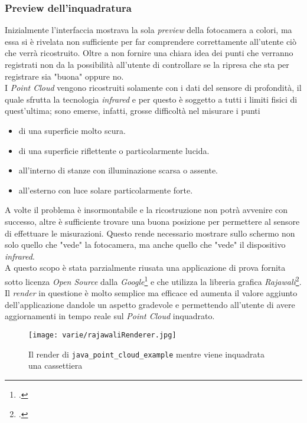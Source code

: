 \subsubsection{Preview dell'inquadratura}
\label{cap:frame_preview}
Inizialmente l'interfaccia mostrava la sola \emph{preview} della fotocamera a colori, ma essa si è rivelata non sufficiente per far comprendere correttamente all'utente ciò che verrà ricostruito. Oltre a non fornire una chiara idea dei punti che verranno registrati non da la possibilità all'utente di controllare se la ripresa che sta per registrare sia "buona" oppure no.\\
I \emph{Point Cloud} vengono ricostruiti solamente con i dati del sensore di profondità, il quale sfrutta la tecnologia \emph{infrared} e per questo è soggetto a tutti i limiti fisici di quest'ultima; sono emerse, infatti, grosse difficoltà nel misurare i punti
\begin{itemize}
	\item di una superficie molto scura.
	\item di una superficie riflettente o particolarmente lucida.
	\item all'interno di stanze con illuminazione scarsa o assente.
	\item all'esterno con luce solare particolarmente forte.
\end{itemize}
A volte il problema è insormontabile e la ricostruzione non potrà avvenire con successo, altre è sufficiente trovare una buona posizione per permettere al sensore di effettuare le misurazioni. Questo rende necessario mostrare sullo schermo non solo quello che "vede" la fotocamera, ma anche quello che "vede" il dispositivo \emph{infrared}.\\
A questo scopo è stata parzialmente riusata una applicazione di prova fornita sotto licenza \emph{Open Source} dalla \emph{Google}\footcite{GitHub: https://github.com/googlesamples/tango-examples-java} e che utilizza la libreria grafica \emph{Rajawali}\footcite{GitHub: https://github.com/Rajawali/Rajawali}.\\
Il \emph{render} in questione è molto semplice ma efficace ed aumenta il valore aggiunto dell'applicazione dandole un aspetto gradevole e permettendo all'utente di avere aggiornamenti in tempo reale sul \emph{Point Cloud} inquadrato.
\begin{figure}[H] 
    \centering 
    \texttt{[image: varie/rajawaliRenderer.jpg]} 
    \caption{Il render di \texttt{java\_point\_cloud\_example} mentre viene inquadrata una cassettiera}
\end{figure}


